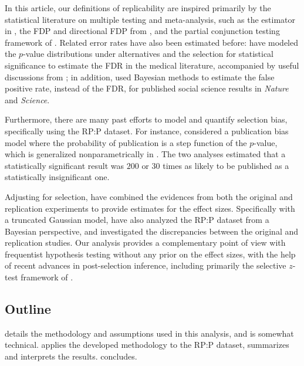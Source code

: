 \documentclass[aoas, preprint]{imsart}
\theoremstyle{definition}
\theoremstyle{custom}
\begin{document}
  In this article, our definitions of replicability are inspired primarily by the statistical literature on multiple testing and meta-analysis, such as the estimator in \citet{Storey:2002vj}, the FDP and directional FDP from \citet{Benjamini:2000ka,Benjamini:2005bv}, and the partial conjunction testing framework of \citet{Heller:2007,Benjamini:2008kj}. Related error rates have also been estimated before: \citet{Jager:2013dq} have modeled the $p$-value distributions under alternatives and the selection for statistical significance to estimate the FDR in the medical literature, accompanied by useful discussions from \citet{Gelman:2013ep,Goodman:2013kj,Ioannidis:2013fz}; in addition, \citet{Camerer:2018de} used Bayesian methods to estimate the false positive rate, instead of the FDR, for published social science results in {\em Nature} and {\em Science}.

  Furthermore, there are many past efforts to model and quantify selection bias, specifically using the RP:P dataset. For instance, \citet{Johnson:2017gu} considered a publication bias model where the probability of publication is a step function of the $p$-value, which is generalized nonparametrically in \citet{Andrews:2018vh}. The two analyses estimated that a statistically significant result was $200$ \citep{Johnson:2017gu} or $30$ \citep{Andrews:2018vh} times as likely to be published as a statistically insignificant one.

  Adjusting for selection, \citet{vanAert:2017,vanAert:2018} have combined the evidences from both the original and replication experiments to provide estimates for the effect sizes. Specifically with a truncated Gaussian model, \citet{Etz:2016gx} have also analyzed the RP:P dataset from a Bayesian perspective, and investigated the discrepancies between the original and replication studies. Our analysis provides a complementary point of view with frequentist hypothesis testing without any prior on the effect sizes, with the help of recent advances in post-selection inference, including primarily the selective $z$-test framework of \citet{Lee:2016fv}.

\subsection{Outline}

   details the methodology and assumptions used in this analysis, and is somewhat technical.  applies the developed methodology to the RP:P dataset, summarizes and interprets the results.  concludes.
\end{document}
